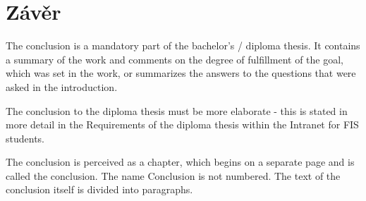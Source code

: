 \chapter*{Závěr}

The conclusion is a mandatory part of the bachelor's / diploma thesis. It contains a summary of the work and comments on the degree of fulfillment of the goal, which was set in the work, or summarizes the answers to the questions that were asked in the introduction.

The conclusion to the diploma thesis must be more elaborate - this is stated in more detail in the Requirements of the diploma thesis within the Intranet for FIS students.

The conclusion is perceived as a chapter, which begins on a separate page and is called the conclusion. The name Conclusion is not numbered. The text of the conclusion itself is divided into paragraphs.

